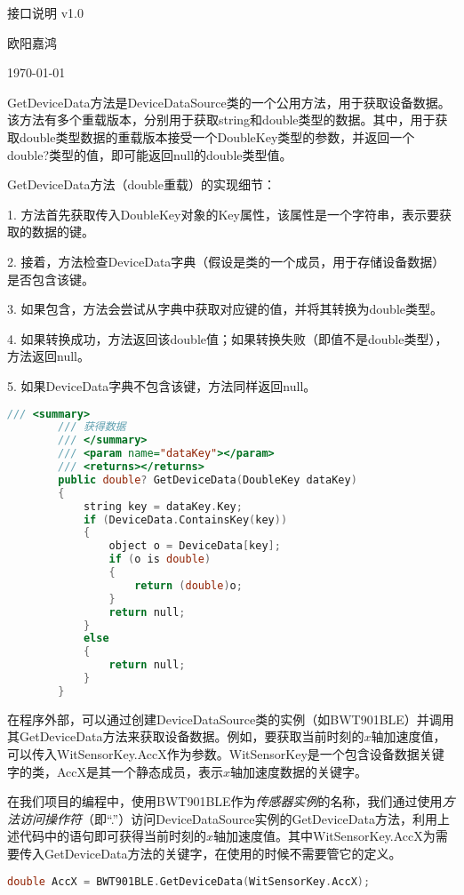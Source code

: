 \documentclass[12pt,hyperref,a4paper,UTF8]{ctexart}
\begin{document}
	\begin{Huge}
		\begin{center}
			接口说明 v1.0
		\end{center}
	\end{Huge}
	\begin{center}
	欧阳嘉鸿
	
		\today
	\end{center}
	GetDeviceData方法是DeviceDataSource类的一个公用方法，用于获取设备数据。该方法有多个重载版本，分别用于获取string和double类型的数据。其中，用于获取double类型数据的重载版本接受一个DoubleKey类型的参数，并返回一个double?类型的值，即可能返回null的double类型值。
	
	GetDeviceData方法（double重载）的实现细节：
	
	1. 方法首先获取传入DoubleKey对象的Key属性，该属性是一个字符串，表示要获取的数据的键。
	
	2. 接着，方法检查DeviceData字典（假设是类的一个成员，用于存储设备数据）是否包含该键。
	
	3. 如果包含，方法会尝试从字典中获取对应键的值，并将其转换为double类型。
	
	4. 如果转换成功，方法返回该double值；如果转换失败（即值不是double类型），方法返回null。
	
	5. 如果DeviceData字典不包含该键，方法同样返回null。
	\begin{lstlisting}[language=c++,title=注：GetDeviceData方法（double重载）的定义]
		/// <summary>
		/// 获得数据
		/// </summary>
		/// <param name="dataKey"></param>
		/// <returns></returns>
		public double? GetDeviceData(DoubleKey dataKey)
		{
			string key = dataKey.Key;
			if (DeviceData.ContainsKey(key))
			{
				object o = DeviceData[key];
				if (o is double)
				{
					return (double)o;
				}
				return null;
			}
			else
			{
				return null;
			}
		}
	\end{lstlisting}
	
	在程序外部，可以通过创建DeviceDataSource类的实例（如BWT901BLE）并调用其GetDeviceData方法来获取设备数据。例如，要获取当前时刻的\(x\)轴加速度值，可以传入WitSensorKey.AccX作为参数。WitSensorKey是一个包含设备数据关键字的类，AccX是其一个静态成员，表示\(x\)轴加速度数据的关键字。
	
	在我们项目的编程中，使用BWT901BLE作为\emph{传感器实例}的名称，我们通过使用\emph{方法访问操作符}（即“.”）访问DeviceDataSource实例的GetDeviceData方法，利用上述代码中的语句即可获得当前时刻的\(x\)轴加速度值。其中WitSensorKey.AccX为需要传入GetDeviceData方法的关键字，在使用的时候不需要管它的定义。
	\begin{lstlisting}[language=c++,title=注：使用GetDeviceData方法的示例]
		double AccX = BWT901BLE.GetDeviceData(WitSensorKey.AccX);
	\end{lstlisting}
\end{document}
